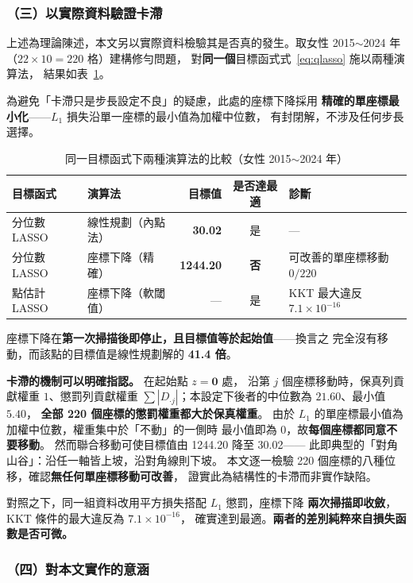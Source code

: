 \documentclass[UTF8, fontset=macnew, a4paper, 12pt]{ctexart}
\begin{document}
\subsubsection{（三）以實際資料驗證卡滯}

上述為理論陳述，本文另以實際資料檢驗其是否真的發生。取女性
2015$\sim$2024 年（$22\times10=220$ 格）建構修勻問題，
對\textbf{同一個}目標函式式~\eqref{eq:qlasso} 施以兩種演算法，
結果如表~\ref{tab:algo}。

為避免「卡滯只是步長設定不良」的疑慮，此處的座標下降採用
\textbf{精確的單座標最小化}——$L_1$ 損失沿單一座標的最小值為加權中位數，
有封閉解，不涉及任何步長選擇。

\begin{table}[H]
\centering
\caption{同一目標函式下兩種演算法的比較（女性 2015$\sim$2024 年）}
\small
\begin{tabular}{llrcl}
\toprule
目標函式 & 演算法 & 目標值 & 是否達最適 & 診斷\\
\midrule
分位數 LASSO & 線性規劃（內點法） & \textbf{30.02} & 是 & ---\\
分位數 LASSO & 座標下降（精確） & \textbf{1244.20} & \textbf{否} & 可改善的單座標移動 $0/220$\\
\midrule
點估計 LASSO & 座標下降（軟閾值） & --- & 是 & KKT 最大違反 $7.1\times10^{-16}$\\
\bottomrule
\end{tabular}
\label{tab:algo}
\end{table}

座標下降在\textbf{第一次掃描後即停止，且目標值等於起始值}——換言之
完全沒有移動，而該點的目標值是線性規劃解的 \textbf{41.4 倍}。

\textbf{卡滯的機制可以明確指認。} 在起始點 $z=\mathbf{0}$ 處，
沿第 $j$ 個座標移動時，保真列貢獻權重 $1$、懲罰列貢獻權重
$\sum|D_{\cdot j}|$；本設定下後者的中位數為 $21.60$、最小值 $5.40$，
\textbf{全部 220 個座標的懲罰權重都大於保真權重}。
由於 $L_1$ 的單座標最小值為加權中位數，權重集中於「不動」的一側時
最小值即為 $0$，故\textbf{每個座標都同意不要移動}。
然而聯合移動可使目標值由 1244.20 降至 30.02——
此即典型的「對角山谷」：沿任一軸皆上坡，沿對角線則下坡。
本文逐一檢驗 220 個座標的八種位移，確認\textbf{無任何單座標移動可改善}，
證實此為結構性的卡滯而非實作缺陷。

對照之下，同一組資料改用平方損失搭配 $L_1$ 懲罰，座標下降
\textbf{兩次掃描即收斂}，KKT 條件的最大違反為 $7.1\times10^{-16}$，
確實達到最適。\textbf{兩者的差別純粹來自損失函數是否可微。}

\subsubsection{（四）對本文實作的意涵}
\end{document}
